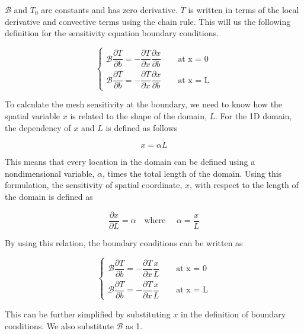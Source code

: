 $\mathcal{B}$ and $\dot{T}_0$ are constants and has zero derivative. $\dot{T}$ is written in terms of the local derivative and convective terms using the chain rule. This will us the following definition for the sensitivity equation boundary conditions.

\begin{equation*}
\begin{cases}
	\mathcal{B} \dfrac{\partial T}{\partial b} = -\dfrac{\partial T}{\partial x} \dfrac{\partial x}{\partial b} \qquad \text{at x = 0}
	\\
	\mathcal{B} \dfrac{\partial T}{\partial b} = -\dfrac{\partial T}{\partial x} \dfrac{\partial x}{\partial b} \qquad \text{at x = L}
\end{cases}
\end{equation*}

To calculate the mesh sensitivity at the boundary, we need to know how the spatial variable $x$ is related to the shape of the domain, $L$. For the 1D domain, the dependency of $x$ and $L$ is defined as follows

\begin{equation*}
	x = \alpha L
\end{equation*}

This means that every location in the domain can be defined using a nondimensional variable, $\alpha$, times the total length of the domain. Using this formulation, the sensitivity of spatial coordinate, $x$, with respect to the length of the domain is defined as

\begin{equation*}
	\frac{\partial x}{\partial L} = \alpha \quad \text{where } \quad \alpha = \frac{x}{L}
\end{equation*}

By using this relation, the boundary conditions can be written as

\begin{equation*}
\begin{cases}
	\mathcal{B} \dfrac{\partial T}{\partial b} = -\dfrac{\partial T}{\partial x} \dfrac{x}{L} \qquad \text{at x = 0}
	\\
	\mathcal{B} \dfrac{\partial T}{\partial b} = -\dfrac{\partial T}{\partial x} \dfrac{x}{L} \qquad \text{at x = L}
\end{cases}
\end{equation*}

This can be further simplified by substituting $x$ in the definition of boundary conditions. We also substitute $\mathcal{B}$ as 1.

